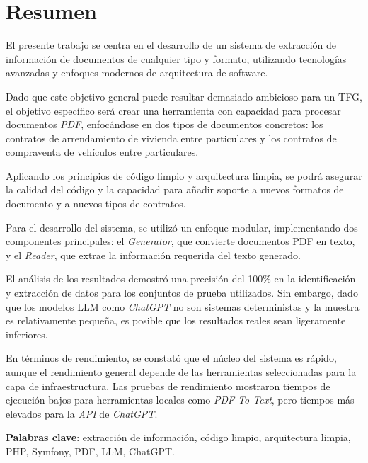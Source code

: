 \newpage
\section*{Resumen}

El presente trabajo se centra en el desarrollo de un sistema de extracción de información de documentos de cualquier
tipo y formato, utilizando tecnologías avanzadas y enfoques modernos de arquitectura de software.

Dado que este objetivo general puede resultar demasiado ambicioso para un TFG, el objetivo específico será crear una
herramienta con capacidad para procesar documentos \textit{PDF}, enfocándose en dos tipos de documentos concretos: los
contratos de arrendamiento de vivienda entre particulares y los contratos de compraventa de vehículos entre
particulares.

Aplicando los principios de código limpio y arquitectura limpia, se podrá asegurar la calidad del
código y la capacidad para añadir soporte a nuevos formatos de documento y a nuevos tipos de contratos.

Para el desarrollo del sistema, se utilizó un enfoque modular, implementando dos componentes principales: el
\textit{Generator}, que convierte documentos PDF en texto, y el \textit{Reader}, que extrae la información requerida
del texto generado.

El análisis de los resultados demostró una precisión del 100\% en la identificación y extracción de datos para los
conjuntos de prueba utilizados.
Sin embargo, dado que los modelos LLM como \textit{ChatGPT} no son sistemas deterministas y la muestra es relativamente
pequeña, es posible que los resultados reales sean ligeramente inferiores.

En términos de rendimiento, se constató que el núcleo del sistema es rápido, aunque el rendimiento general depende de
las herramientas seleccionadas para la capa de infraestructura.
Las pruebas de rendimiento mostraron tiempos de ejecución bajos para herramientas locales como \textit{PDF To Text},
pero tiempos más elevados para la \textit{API} de \textit{ChatGPT}.


\vspace{1cm}

\textbf{Palabras clave}: extracción de información, código limpio, arquitectura limpia, PHP, Symfony, PDF, LLM, ChatGPT.

